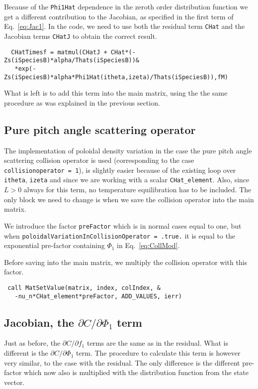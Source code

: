 \documentclass[12pt]{article}
\begin{document}
\noindent
Because of the \texttt{Phi1Hat} dependence in the zeroth order distribution function we get a different contribution to the Jacobian, as specified in the first term of Eq.~\eqref{eq:Jac1}. In the code, we need to use both the residual term \texttt{CHat} and the Jacobian terms \texttt{CHatJ} to obtain the correct result. 

\begin{lstlisting}
  CHatTimesf = matmul(CHatJ + CHat*(-Zs(iSpeciesB)*alpha/Thats(iSpeciesB))&
   *exp(-Zs(iSpeciesB)*alpha*Phi1Hat(itheta,izeta)/Thats(iSpeciesB)),fM)
\end{lstlisting}

\noindent
What is left is to add this term into the main matrix, using the the same procedure as was explained in the previous section.

\subsection*{Pure pitch angle scattering operator}
The implementation of poloidal density variation in the case the pure pitch angle scattering collision operator is used (corresponding to the case \texttt{collisionoperator = 1}), is slightly easier because of the existing loop over \texttt{itheta}, \texttt{izeta} and since we are working with a scalar \texttt{CHat\_element}. Also, since $L > 0$ always for this term, no temperature equilibration has to be included. The only block we need to change is when we save the collision operator into the main matrix. 

We introduce the factor \texttt{preFactor} which is in normal cases equal to one, but when \texttt{poloidalVariationInCollisionOperator = .true.} it is equal to the exponential pre-factor containing $\Phi_1$ in Eq.~\eqref{eq:CollMod}.

Before saving into the main matrix, we multiply the collision operator with this factor.

 \begin{lstlisting}
 call MatSetValue(matrix, index, colIndex, & 
   -nu_n*CHat_element*preFactor, ADD_VALUES, ierr)
  \end{lstlisting}

\subsection*{Jacobian, the $\partial C/\partial \Phi_1$ term}
Just as before, the   $\partial C/\partial f_1$ terms are the same as in the residual. What is different is the $\partial C/\partial \Phi_1$  term. The procedure to calculate this term is however very similar, to the case with the residual. The only difference is the different pre-factor which now also is multiplied with the distribution function from the state vector.
\end{document}
